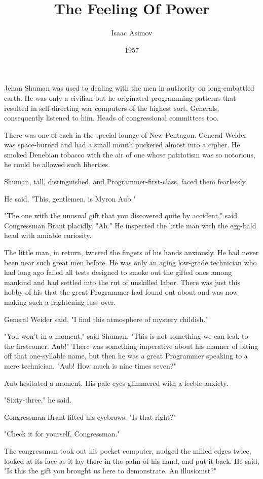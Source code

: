 \documentclass{amsart}
\begin{document}
\title{The Feeling Of Power}

\author{Isaac Asimov}
\date{1957}
\maketitle
Jehan Shuman was used to dealing with the men in authority on
long-embattled earth. He was only a civilian but he originated
programming patterns that resulted in self-directing war computers of
the highest sort. Generals, consequently listened to him. Heads of
congressional committees too.

There was one of each in the special lounge of New Pentagon. General
Weider was space-burned and had a small mouth puckered almost into a
cipher. He smoked Denebian tobacco with the air of one whose
patriotism was so notorious, he could be allowed such liberties.

Shuman, tall, distinguished, and Programmer-first-class, faced them
fearlessly.

He said, "This, gentlemen, is Myron Aub."

"The one with the unusual gift that you discovered quite by accident,"
said Congressman Brant placidly. "Ah." He inspected the little man
with the egg-bald head with amiable curiosity.

The little man, in return, twisted the fingers of his hands anxiously.
He had never been near such great men before. He was only an aging
low-grade technician who had long ago failed all tests designed to
smoke out the gifted ones among mankind and had settled into the rut
of unskilled labor. There was just this hobby of his that the great
Programmer had found out about and was now making such a frightening
fuss over.

General Weider said, "I find this atmosphere of mystery childish."

"You won't in a moment," said Shuman. "This is not something we can
leak to the firstcomer. Aub!" There was something imperative about his
manner of biting off that one-syllable name, but then he was a great
Programmer speaking to a mere technician. "Aub! How much is nine times
seven?"

Aub hesitated a moment. His pale eyes glimmered with a feeble anxiety.

"Sixty-three," he said.

Congressman Brant lifted his eyebrows. "Is that right?"

"Check it for yourself, Congressman."

The congressman took out his pocket computer, nudged the milled edges
twice, looked at its face as it lay there in the palm of his hand, and
put it back. He said, "Is this the gift you brought us here to
demonstrate. An illusionist?"
\end{document}
